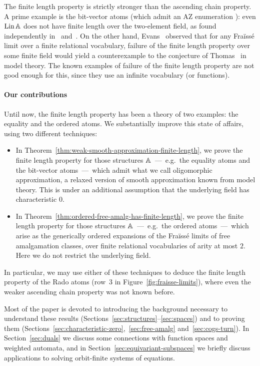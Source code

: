 The finite length property is strictly stronger than the ascending chain property.
A prime example is the bit-vector atoms (which admit an AZ enumeration \cite[p.~143]{Hrushovski}):
even $\operatorname{Lin} \mathbb{A}$ does not have finite length over the two-element field, as found independently in~\cite[Thm.~2.7]{EvansGray_98} and~\cite[Thm.~4.16]{BFKM24}.
On the other hand, Evans~\cite[Rem.~1.3]{Evans_pm1} observed that for any Fraïssé limit over a finite relational vocabulary, failure of the finite length property over some finite field
would yield a counterexample to the conjecture of Thomas~\cite[p.~177]{thomas1991reducts} in model theory.
The known examples of failure of the finite length property are not good enough for this, since they use an infinite vocabulary (or functions).

\paragraph*{Our contributions} 
Until now, the finite length property has been a theory of two examples: the equality and the ordered atoms. 
We substantially improve this state of affairs, using two different techniques:
\begin{itemize}
    \item 
    In Theorem~\ref{thm:weak-smooth-approximation-finite-length}, we prove the finite length property for those structures $\mathbb{A}$~---~e.g.~the equality atoms and the bit-vector atoms~---~which admit what we call oligomorphic approximation, a relaxed version of smooth approximation known from model theory. 
    This is under an additional assumption that the underlying field has characteristic $0$.

    \item 
    In Theorem~\ref{thm:ordered-free-amalg-has-finite-length}, we prove the finite length property for those structures $\mathbb{A}$~---~e.g.~the ordered atoms~---~which arise as the generically ordered expansions of the Fraïssé limits of free amalgamation classes, over finite relational vocabularies of arity at most $2$. 
    Here we do not restrict the underlying field.
\end{itemize}
In particular, we may use either of these techniques to deduce the finite length property of the Rado atoms (row~3 in Figure~\ref{fig:fraisse-limits}), where even the weaker ascending chain property was not known before.

Most of the paper is devoted to introducing the background necessary to understand these results (Sections~\ref{sec:structures}--\ref{sec:spaces}) and to proving them (Sections~\ref{sec:characteristic-zero},~\ref{sec:free-amalg} and~\ref{sec:cogs-turn}). 
In Section~\ref{sec:duals} we discuss some connections with function spaces and weighted automata, and in Section~\ref{sec:equivariant-subspaces} we  briefly discuss  applications to solving orbit-finite systems of equations.
